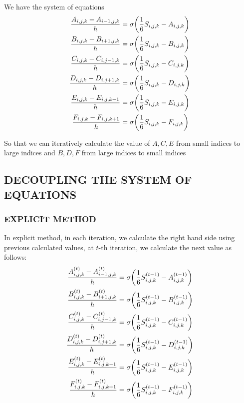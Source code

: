 We have the system of equations
\begin{align*}
	\frac{A_{i, j, k} - A_{i-1, j, k}}{h} &= \sigma \tuple*{\frac{1}{6} S_{i, j, k} - A_{i, j, k}} \\
	\frac{B_{i, j, k} - B_{i+1, j, k}}{h} &= \sigma \tuple*{\frac{1}{6} S_{i, j, k} - B_{i, j, k}} \\
	\frac{C_{i, j, k} - C_{i, j-1, k}}{h} &= \sigma \tuple*{\frac{1}{6} S_{i, j, k} - C_{i, j, k}} \\
	\frac{D_{i, j, k} - D_{i, j+1, k}}{h} &= \sigma \tuple*{\frac{1}{6} S_{i, j, k} - D_{i, j, k}} \\
	\frac{E_{i, j, k} - E_{i, j, k-1}}{h} &= \sigma \tuple*{\frac{1}{6} S_{i, j, k} - E_{i, j, k}} \\
	\frac{F_{i, j, k} - F_{i, j, k+1}}{h} &= \sigma \tuple*{\frac{1}{6} S_{i, j, k} - F_{i, j, k}}
\end{align*}

So that we can iteratively calculate the value of $A, C, E$ from small indices to large indices and $B, D, F$ from large indices to small indices

\subsection{DECOUPLING THE SYSTEM OF EQUATIONS}

\subsubsection{EXPLICIT METHOD}

In explicit method, in each iteration, we calculate the right hand side using previous calculated values, at $t$-th iteration, we calculate the next value as follows:
\begin{align*}
	\frac{A_{i, j, k}^{(t)} - A_{i-1, j, k}^{(t)}}{h} &= \sigma \tuple*{\frac{1}{6} S_{i, j, k}^{(t-1)} - A_{i, j, k}^{(t-1)}} \\
	\frac{B_{i, j, k}^{(t)} - B_{i+1, j, k}^{(t)}}{h} &= \sigma \tuple*{\frac{1}{6} S_{i, j, k}^{(t-1)} - B_{i, j, k}^{(t-1)}} \\
	\frac{C_{i, j, k}^{(t)} - C_{i, j-1, k}^{(t)}}{h} &= \sigma \tuple*{\frac{1}{6} S_{i, j, k}^{(t-1)} - C_{i, j, k}^{(t-1)}} \\
	\frac{D_{i, j, k}^{(t)} - D_{i, j+1, k}^{(t)}}{h} &= \sigma \tuple*{\frac{1}{6} S_{i, j, k}^{(t-1)} - D_{i, j, k}^{(t-1)}} \\
	\frac{E_{i, j, k}^{(t)} - E_{i, j, k-1}^{(t)}}{h} &= \sigma \tuple*{\frac{1}{6} S_{i, j, k}^{(t-1)} - E_{i, j, k}^{(t-1)}} \\
	\frac{F_{i, j, k}^{(t)} - F_{i, j, k+1}^{(t)}}{h} &= \sigma \tuple*{\frac{1}{6} S_{i, j, k}^{(t-1)} - F_{i, j, k}^{(t-1)}}
\end{align*}

